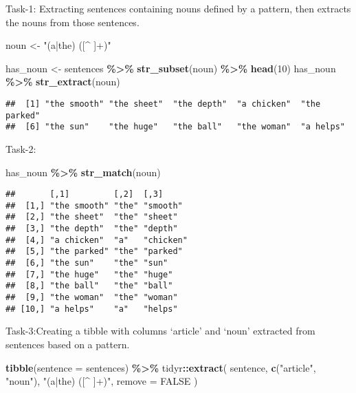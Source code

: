 \documentclass[
]{article}
\newenvironment{Shaded}{\begin{snugshade}}{\end{snugshade}}
\newcommand{\AttributeTok}[1]{\textcolor[rgb]{0.13,0.29,0.53}{#1}}
\newcommand{\ConstantTok}[1]{\textcolor[rgb]{0.56,0.35,0.01}{#1}}
\newcommand{\DecValTok}[1]{\textcolor[rgb]{0.00,0.00,0.81}{#1}}
\newcommand{\FunctionTok}[1]{\textcolor[rgb]{0.13,0.29,0.53}{\textbf{#1}}}
\newcommand{\NormalTok}[1]{#1}
\newcommand{\OtherTok}[1]{\textcolor[rgb]{0.56,0.35,0.01}{#1}}
\newcommand{\SpecialCharTok}[1]{\textcolor[rgb]{0.81,0.36,0.00}{\textbf{#1}}}
\newcommand{\StringTok}[1]{\textcolor[rgb]{0.31,0.60,0.02}{#1}}
\begin{document}
Task-1: Extracting sentences containing nouns defined by a pattern, then
extracts the nouns from those sentences.

\begin{Shaded}
\begin{Highlighting}[]
\NormalTok{noun }\OtherTok{\textless{}{-}} \StringTok{"(a|the) ([\^{} ]+)"}

\NormalTok{has\_noun }\OtherTok{\textless{}{-}}\NormalTok{ sentences }\SpecialCharTok{\%\textgreater{}\%}
  \FunctionTok{str\_subset}\NormalTok{(noun) }\SpecialCharTok{\%\textgreater{}\%}
  \FunctionTok{head}\NormalTok{(}\DecValTok{10}\NormalTok{)}
\NormalTok{has\_noun }\SpecialCharTok{\%\textgreater{}\%} 
  \FunctionTok{str\_extract}\NormalTok{(noun)}
\end{Highlighting}
\end{Shaded}

\begin{verbatim}
##  [1] "the smooth" "the sheet"  "the depth"  "a chicken"  "the parked"
##  [6] "the sun"    "the huge"   "the ball"   "the woman"  "a helps"
\end{verbatim}

Task-2:

\begin{Shaded}
\begin{Highlighting}[]
\NormalTok{has\_noun }\SpecialCharTok{\%\textgreater{}\%} 
  \FunctionTok{str\_match}\NormalTok{(noun)}
\end{Highlighting}
\end{Shaded}

\begin{verbatim}
##       [,1]         [,2]  [,3]     
##  [1,] "the smooth" "the" "smooth" 
##  [2,] "the sheet"  "the" "sheet"  
##  [3,] "the depth"  "the" "depth"  
##  [4,] "a chicken"  "a"   "chicken"
##  [5,] "the parked" "the" "parked" 
##  [6,] "the sun"    "the" "sun"    
##  [7,] "the huge"   "the" "huge"   
##  [8,] "the ball"   "the" "ball"   
##  [9,] "the woman"  "the" "woman"  
## [10,] "a helps"    "a"   "helps"
\end{verbatim}

Task-3:Creating a tibble with columns `article' and `noun' extracted
from sentences based on a pattern.

\begin{Shaded}
\begin{Highlighting}[]
\FunctionTok{tibble}\NormalTok{(}\AttributeTok{sentence =}\NormalTok{ sentences) }\SpecialCharTok{\%\textgreater{}\%} 
\NormalTok{  tidyr}\SpecialCharTok{::}\FunctionTok{extract}\NormalTok{(}
\NormalTok{    sentence, }\FunctionTok{c}\NormalTok{(}\StringTok{"article"}\NormalTok{, }\StringTok{"noun"}\NormalTok{), }\StringTok{"(a|the) ([\^{} ]+)"}\NormalTok{, }
    \AttributeTok{remove =} \ConstantTok{FALSE}
\NormalTok{  )}
\end{Highlighting}
\end{Shaded}
\end{document}
